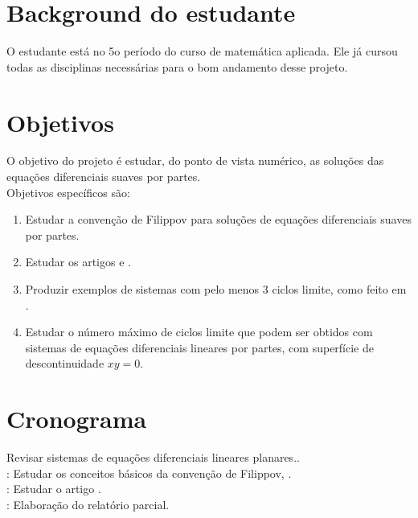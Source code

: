 \documentclass[12pt]{article}
\begin{document}
\section{Background do estudante}

O estudante está no 5o período do curso de matemática aplicada. Ele já cursou todas as disciplinas necessárias para o bom andamento desse projeto.


\section{Objetivos}

O objetivo do projeto é estudar, do ponto de vista numérico, as soluções das equações diferenciais suaves por partes. \\

Objetivos específicos são:

\begin{enumerate}
\item Estudar a convenção de Filippov para soluções de equações diferenciais suaves por partes.
\item Estudar os artigos \cite{china1} e \cite{jaume1}.
\item Produzir exemplos de sistemas com pelo menos 3 ciclos limite, como feito em \cite{china1}.
\item Estudar o número máximo de ciclos limite que podem ser obtidos com sistemas de equações diferenciais lineares por partes, com superfície de descontinuidade $xy=0$.
\end{enumerate}






\section{Cronograma}

 Revisar sistemas de equações diferenciais lineares planares..\\

: Estudar os conceitos básicos da convenção de Filippov, \cite{F}.\\

: Estudar o artigo \cite{china1}.\\

: Elaboração do relatório parcial.\\
\end{document}
